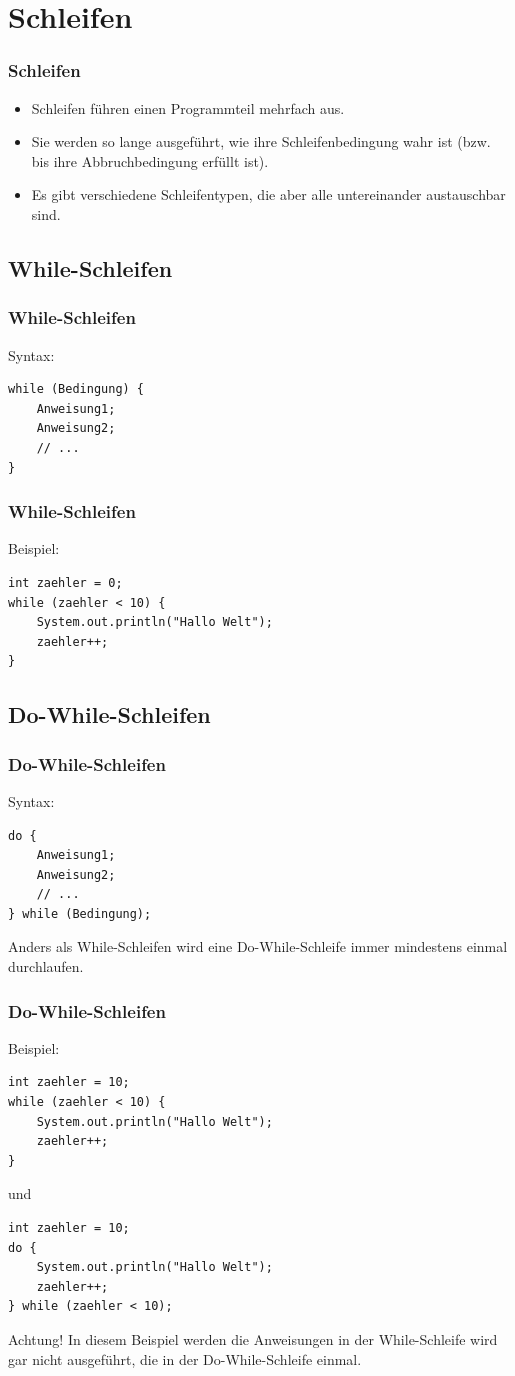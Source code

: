 \documentclass[final]{beamer}
\begin{document}
\section{Schleifen}
\begin{frame}
	\frametitle{Schleifen}
	\begin{itemize}
	\item{Schleifen führen einen Programmteil mehrfach aus.}
	\item{Sie werden so lange ausgeführt, wie ihre Schleifenbedingung wahr ist
		(bzw. bis ihre Abbruchbedingung erfüllt ist).}
	\item{Es gibt verschiedene Schleifentypen, die aber alle untereinander austauschbar sind.}
	\end{itemize}
\end{frame}

\subsection{While-Schleifen}
\begin{frame}[containsverbatim]
	\frametitle{While-Schleifen}
	Syntax:
	\begin{lstlisting}
while (Bedingung) {
	Anweisung1;
	Anweisung2;
	// ...
}
	\end{lstlisting}
\end{frame}
\begin{frame}[containsverbatim]
	\frametitle{While-Schleifen}
	Beispiel:
	\begin{lstlisting}
int zaehler = 0;
while (zaehler < 10) {
	System.out.println("Hallo Welt");
	zaehler++;
}
	\end{lstlisting}
\end{frame}

\subsection{Do-While-Schleifen}
\begin{frame}[containsverbatim]
	\frametitle{Do-While-Schleifen}
	Syntax:
	\begin{lstlisting}
do {
	Anweisung1;
	Anweisung2;
	// ...
} while (Bedingung);
	\end{lstlisting}
	Anders als While-Schleifen wird eine Do-While-Schleife immer mindestens einmal durchlaufen.
\end{frame}
\begin{frame}[containsverbatim]
	\frametitle{Do-While-Schleifen}
	Beispiel:
	\begin{lstlisting}
int zaehler = 10;
while (zaehler < 10) {
	System.out.println("Hallo Welt");
	zaehler++;
}
	\end{lstlisting}
	und
	\begin{lstlisting}
int zaehler = 10;
do {
	System.out.println("Hallo Welt");
	zaehler++;
} while (zaehler < 10);
\end{lstlisting}
	\begin{alertblock}{Achtung!}
		In diesem Beispiel werden die Anweisungen in der While-Schleife wird gar nicht ausgeführt, die in der Do-While-Schleife einmal.
	\end{alertblock}
\end{frame}
\end{document}

